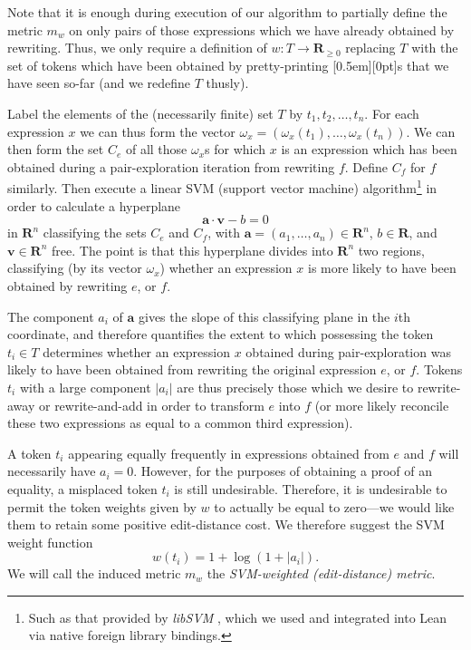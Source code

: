 \documentclass[a4paper]{article}
\newcommand{\RR}{\mathbf{R}}
\theoremstyle{plain}
\theoremstyle{definition}
\newcommand{\xx}[1]{{\colorbox{gray!15}{\raisebox{0em}[0.5em][0pt]{\makebox[\width-0.4em]{\texttt{#1}}}}}}
\newcommand{\expr}{\xx{expr}}
\begin{document}
Note that it is enough during execution of our algorithm to partially define the metric $m_w$ on only pairs of those expressions which we have already obtained by rewriting. Thus, we only require a definition of $w : T \to \RR_{\geq 0}$ replacing $T$ with the set of tokens which have been obtained by pretty-printing \expr{}s that we have seen so-far (and we redefine $T$ thusly).

Label the elements of the (necessarily finite) set $T$ by $t_1, t_2, \ldots, t_n$. For each expression $x$ we can thus form the vector $\omega_x = (\omega_x(t_1), \ldots, \omega_x(t_n))$. We can then form the set $C_e$ of all those $\omega_x$s for which $x$ is an expression which has been obtained during a pair-exploration iteration from rewriting $f$. Define $C_f$ for $f$ similarly. Then execute a linear SVM (support vector machine) algorithm\footnote{Such as that provided by \textit{libSVM} \cite{chang2011libsvm}, which we used and integrated into Lean via native foreign library bindings.} in order to calculate a hyperplane
\begin{equation*}
  \mathbf{a} \cdot \mathbf{v} - b = 0
\end{equation*}
in $\RR^{n}$ classifying the sets $C_e$ and $C_f$, with $\mathbf{a} = (a_1, \ldots, a_n) \in \RR^n$, $b \in \RR$, and $\mathbf{v} \in \RR^n$ free. The point is that this hyperplane divides into $\RR^n$ two regions, classifying (by its vector $\omega_x$) whether an expression $x$ is more likely to have been obtained by rewriting $e$, or $f$.

The component $a_i$ of $\mathbf{a}$ gives the slope of this classifying plane in the $i$th coordinate, and therefore quantifies the extent to which possessing the token $t_i \in T$ determines whether an expression $x$ obtained during pair-exploration was likely to have been obtained from rewriting the original expression $e$, or $f$. Tokens $t_i$ with a large component $\lvert a_i \rvert$ are thus precisely those which we desire to rewrite-away or rewrite-and-add in order to transform $e$ into $f$ (or more likely reconcile these two expressions as equal to a common third expression).

A token $t_i$ appearing equally frequently in expressions obtained from $e$ and $f$ will necessarily have $a_i = 0$. However, for the purposes of obtaining a proof of an equality, a misplaced token $t_i$ is still undesirable. Therefore, it is undesirable to permit the token weights given by $w$ to actually be equal to zero---we would like them to retain some positive edit-distance cost. We therefore suggest the SVM weight function
\begin{equation*}
  w(t_i) = 1 + \log(1 + \lvert a_i \rvert).
\end{equation*}
We will call the induced metric $m_w$ the \textit{SVM-weighted (edit-distance) metric}.
\end{document}
